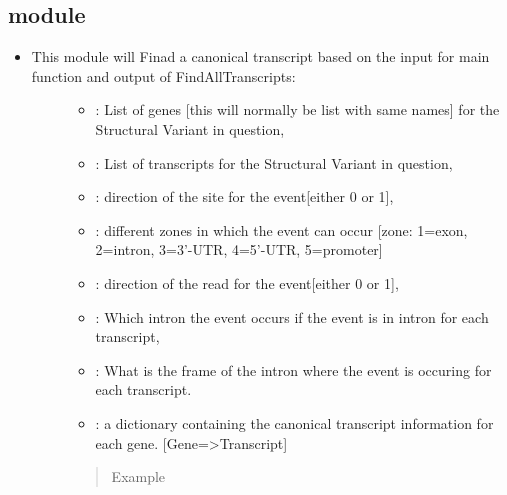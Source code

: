 \documentclass[letterpaper,10pt,english]{sphinxmanual}
\begin{document}
\subsection{ module}
\label{\detokenize{iAnnotateSV:findcanonicaltranscript-module}}\begin{itemize}
\item {} \begin{description}
\item[{This module will Finad a canonical transcript based on the input for main function and output of FindAllTranscripts:}] \leavevmode\begin{itemize}
\item {} 
 : List of genes {[}this will normally be list with same names{]} for the Structural Variant in question,

\item {} 
 : List of transcripts for the Structural Variant in question,

\item {} 
 : direction of the site for the event{[}either 0 or 1{]},

\item {} 
 : different zones in which the event can occur {[}zone: 1=exon, 2=intron, 3=3’-UTR, 4=5’-UTR, 5=promoter{]}

\item {} 
 : direction of the read for the event{[}either 0 or 1{]},

\item {} 
 : Which intron the event occurs if the event is in intron for each transcript,

\item {} 
 : What is the frame of the intron where the event is occuring for each transcript.

\item {} 
 : a dictionary containing the canonical transcript information for each gene. {[}Gene=\textgreater{}Transcript{]}

\end{itemize}
\begin{quote}\begin{description}
\item[{Example}] \leavevmode
{}

\end{description}\end{quote}

\end{description}

\end{itemize}
\end{document}
